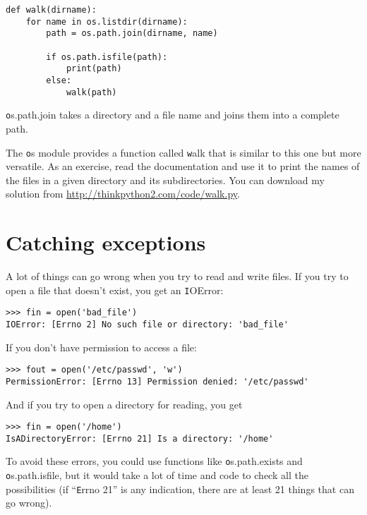 \documentclass[
DIV=11,
fontsize=12,
twoside,
headinclude=false,
titlepage=firstiscover,
abstract=true,
headsepline=true,
footsepline=true,
chapterprefix=true, %
headings=big,
bibliography=totoc,%
captions=tableheading
]{scrbook}
\theoremstyle{definition}
\begin{document}
\begin{lstlisting}
def walk(dirname):
    for name in os.listdir(dirname):
        path = os.path.join(dirname, name)

        if os.path.isfile(path):
            print(path)
        else:
            walk(path)
\end{lstlisting}
%
{\texttt os.path.join} takes a directory and a file name and joins
them into a complete path.  

The {\texttt os} module provides a function called {\texttt walk} that is
similar to this one but more versatile.  As an exercise, read the
documentation and use it to print the names of the files in a given
directory and its subdirectories.  You can download my solution from
\url{http://thinkpython2.com/code/walk.py}.


\section{Catching exceptions}
\label{catch}

A lot of things can go wrong when you try to read and write
files.  If you try to open a file that doesn't exist, you get an
{\texttt IOError}:

\begin{lstlisting}
>>> fin = open('bad_file')
IOError: [Errno 2] No such file or directory: 'bad_file'
\end{lstlisting}
%
If you don't have permission to access a file:

\begin{lstlisting}
>>> fout = open('/etc/passwd', 'w')
PermissionError: [Errno 13] Permission denied: '/etc/passwd'
\end{lstlisting}
%
And if you try to open a directory for reading, you get

\begin{lstlisting}
>>> fin = open('/home')
IsADirectoryError: [Errno 21] Is a directory: '/home'
\end{lstlisting}
%
To avoid these errors, you could use functions like {\texttt os.path.exists}
and {\texttt os.path.isfile}, but it would take a lot of time and code
to check all the possibilities (if ``{\texttt Errno 21}'' is any
indication, there are at least 21 things that can go wrong).
\end{document}
